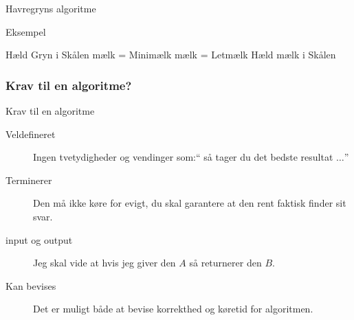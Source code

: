 \documentclass[12pt,t]{beamer}
\begin{document}
    \begin{frame}[plain]{Havregryns algoritme}
        \begin{block}{Eksempel}
        \vspace{-1.5em}
        \begin{algorithm}[H]
            \caption{\newline Indgangsbetingelser: En skål, mælk, havregryn
                     \newline Udgangsbetingelser: Morgenmad
            }
            \begin{algorithmic}
                    \State Hæld Gryn i Skålen
                \EndWhile
                    \State mælk = Minimælk
                \Else
                    \State mælk = Letmælk
                \EndIf
                    \State Hæld mælk i Skålen
                \EndWhile
            \end{algorithmic}
        \end{algorithm}
        \end{block}
    \end{frame}

    \begin{frame}
        \frametitle{Krav til en algoritme?}
        \begin{block}{Krav til en algoritme}
        \begin{description}
            \item[Veldefineret] Ingen tvetydigheder og vendinger som:``
            så tager du det bedste resultat $\dots$'' \pause{}
            \item[Terminerer] Den må ikke køre for evigt, du skal garantere
            at den rent faktisk finder sit svar. \pause{}
            \item[input og output] Jeg skal vide at hvis jeg giver
            den $A$ så returnerer den $B$. \pause{}
            \item[Kan bevises] Det er muligt både at bevise korrekthed og
            køretid for algoritmen.
        \end{description}
        \end{block}
    \end{frame}
\end{document}
